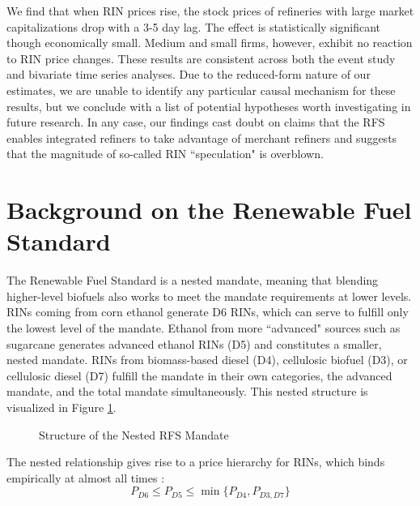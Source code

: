 \documentclass[11pt]{article}
\begin{document}
We find that when RIN prices rise, the stock prices of refineries with large market capitalizations drop with a 3-5 day lag. The effect is statistically significant though economically small. Medium and small firms, however, exhibit no reaction to RIN price changes. These results are consistent across both the event study and bivariate time series analyses. Due to the reduced-form nature of our estimates, we are unable to identify any particular causal mechanism for these results, but we conclude with a list of potential hypotheses worth investigating in future research. In any case, our findings cast doubt on claims that the RFS enables integrated refiners to take advantage of merchant refiners and suggests that the magnitude of so-called RIN ``speculation" is overblown.

\section{Background on the Renewable Fuel Standard}

The Renewable Fuel Standard is a nested mandate, meaning that blending higher-level biofuels also works to meet the mandate requirements at lower levels. RINs coming from corn ethanol generate D6 RINs, which can serve to fulfill only the lowest level of the mandate. Ethanol from more ``advanced" sources such as sugarcane generates advanced ethanol RINs (D5) and constitutes a smaller, nested mandate. RINs from biomass-based diesel (D4), cellulosic biofuel (D3), or cellulosic diesel (D7) fulfill the mandate in their own categories, the advanced mandate, and the total mandate simultaneously. This nested structure is visualized in Figure \ref{RINstructure}.

\begin{figure}[h]
	\caption{Structure of the Nested RFS Mandate}
	\label{RINstructure}
	\centering
\end{figure}
The nested relationship gives rise to a price hierarchy for RINs, which binds empirically at almost all times \citep{Whistance2014}:
$$P_{D6}\le P_{D5} \le \min \{P_{D4}, P_{D3,D7}\}$$
\end{document}
